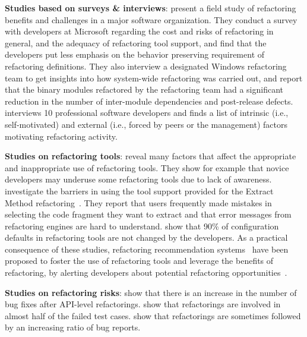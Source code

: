 \noindent\textbf{Studies based on surveys \& interviews}:
\cite{Kim:2012:FSE, kim-tse-2014} present a field study of refactoring benefits and challenges in a major software organization.
They conduct a survey with developers at Microsoft regarding the cost and risks of refactoring in general, and the adequacy of refactoring tool support,
and find that the developers put less emphasis on the behavior preserving requirement of refactoring definitions.
They also interview a designated Windows refactoring team to get insights into how system-wide refactoring was carried out,
and report that the binary modules refactored by the refactoring team had a significant reduction in the number of inter-module dependencies and post-release defects.
\cite{Wang:2009} interviews 10 professional software developers and finds a list of intrinsic (i.e., self-motivated) and external (i.e., forced by peers or the management) factors motivating refactoring activity.


\noindent\textbf{Studies on refactoring tools}:
\cite{Vakilian:2012} reveal many factors that affect the appropriate and inappropriate use of refactoring tools.
They show for example that novice developers may underuse some refactoring tools due to lack of awareness.
\cite{Murphy-Hill:2008} investigate the barriers in using the tool support provided for the {\textsc Extract Method} refactoring~\citep{Fowler:1999}.
They report that users frequently made mistakes in selecting the code fragment they want to extract and that error messages from refactoring engines are hard to understand.
\cite{MurphyHill2012} show that 90\% of configuration defaults in refactoring tools are not changed by the developers.
As a practical consequence of these studies, refactoring recommendation systems~\citep{Bavota:2015} have been proposed to foster the use of refactoring tools and leverage the benefits of refactoring,
by alerting developers about potential refactoring opportunities~\citep{Tsantalis:2009, Tsantalis:2011, Bavota:2011, Sales:2013, Bavota:2014, Silva:2014}. 

\noindent\textbf{Studies on refactoring risks}:
\cite{Kim:2011} show that there is an increase in the number of bug fixes after API-level refactorings.
\cite{Kim:2012:testing} show that refactorings are involved in almost half of the failed test cases.
\cite{Weissgerber:2006} show that refactorings are sometimes followed by an increasing ratio of bug reports.


